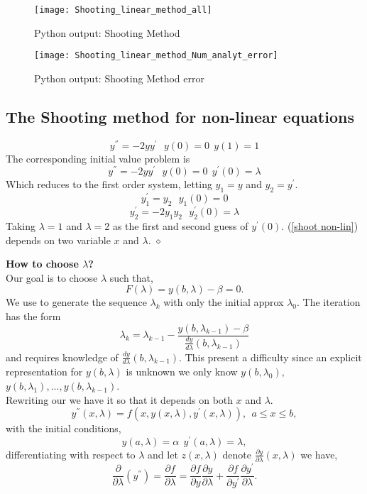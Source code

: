 \begin{figure}[H]
\centering
\texttt{[image: Shooting\_linear\_method\_all]}
\caption{Python output: Shooting Method}
\label{Shooting_method}
\end{figure}

\begin{figure}[H]
\centering
\texttt{[image: Shooting\_linear\_method\_Num\_analyt\_error]}
\caption{Python output: Shooting Method error}
\label{Shooting_method_error}
\end{figure}

\subsection{The Shooting method for non-linear equations}
\begin{example}
\[y^{''}=-2yy^{'} \ \ \ y(0)=0 \ \ y(1)=1\]
The corresponding initial value problem is 
\begin{equation}\label{shoot non-lin}
y^{''}=-2yy^{'} \ \ \ y(0)=0 \ \  y^{'}(0)=\lambda \end{equation}
Which reduces to the first order system, letting $y_1=y$ and $y_2=y^{'}$. 
\[ y^{'}_1=y_2 \ \ \ y_1(0)=0 \]
\[y^{'}_2=-2y_1y_2 \ \ \ y^{'}_2(0)=\lambda \]
Taking $\lambda =1$ and $\lambda=2$ as the first and second guess of $y^{'}(0)$.
(\ref{shoot non-lin}) depends on two variable $x$ and $\lambda$.
$\diamond$
\end{example}
\textbf{How to choose $\lambda$?}\\
Our goal is to choose $\lambda$ such that,
\[F(\lambda)=y(b,\lambda)-\beta=0. \]
We use  to generate the sequence $\lambda_k$ with only the initial approx $\lambda_0$.
The iteration has the form
\[\lambda_k=\lambda_{k-1}-\frac{y(b,\lambda_{k-1})-\beta}{\frac{dy}{d \lambda}(b,\lambda_{k-1})}\]
and requires knowledge of $\frac{dy}{d \lambda}(b,\lambda_{k-1})$.  This present
a difficulty since an explicit representation for $y(b,\lambda)$ is unknown we only know
$y(b,\lambda_0),$ $y(b,\lambda_1),...,y(b,\lambda_{k-1})$.\\
Rewriting our  we have it so that it depends on both $x$ and $\lambda$.
\[ y^{''}(x,\lambda)=f(x,y(x,\lambda),y^{'}(x,\lambda)), \ \ a\leq x \leq b,\]
with the initial conditions,
\[y(a,\lambda)=\alpha \ \ y^{'}(a,\lambda)=\lambda, \]
differentiating with respect to $\lambda$ and let $z(x,\lambda)$ denote $\frac{\partial y}{\partial\lambda}(x,\lambda)$ we have,
\[
\frac{\partial }{\partial \lambda}(y^{''}) = \frac{\partial f}{\partial \lambda}=\frac{\partial f}{\partial y}
\frac{\partial y}{\partial \lambda}+
\frac{\partial f}{\partial y^{'}}
\frac{\partial y^{'}}{\partial \lambda}.
\]
